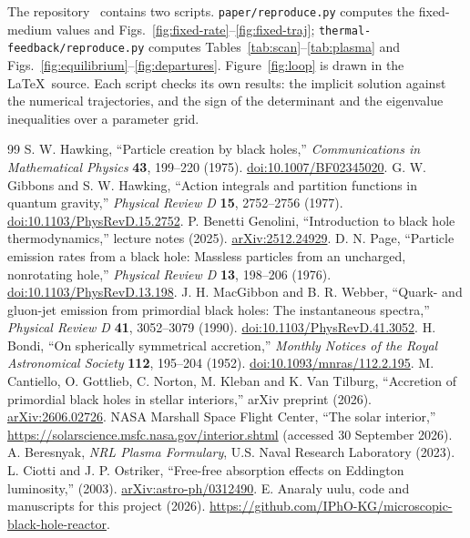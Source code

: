 \documentclass[11pt,a4paper]{article}
\begin{document}
The repository~\cite{repo} contains two scripts. \texttt{paper/reproduce.py} computes the fixed-medium values and Figs.~\ref{fig:fixed-rate}--\ref{fig:fixed-traj}; \texttt{thermal-feedback/reproduce.py} computes Tables~\ref{tab:scan}--\ref{tab:plasma} and Figs.~\ref{fig:equilibrium}--\ref{fig:departures}. Figure~\ref{fig:loop} is drawn in the \LaTeX\ source. Each script checks its own results: the implicit solution against the numerical trajectories, and the sign of the determinant and the eigenvalue inequalities over a parameter grid.

{\raggedright
\begin{thebibliography}{99}
 S. W. Hawking, ``Particle creation by black holes,'' \emph{Communications in Mathematical Physics} \textbf{43}, 199--220 (1975). \href{https://doi.org/10.1007/BF02345020}{doi:10.1007/BF02345020}.
 G. W. Gibbons and S. W. Hawking, ``Action integrals and partition functions in quantum gravity,'' \emph{Physical Review D} \textbf{15}, 2752--2756 (1977). \href{https://doi.org/10.1103/PhysRevD.15.2752}{doi:10.1103/PhysRevD.15.2752}.
 P. Benetti Genolini, ``Introduction to black hole thermodynamics,'' lecture notes (2025). \href{https://arxiv.org/abs/2512.24929}{arXiv:2512.24929}.
 D. N. Page, ``Particle emission rates from a black hole: Massless particles from an uncharged, nonrotating hole,'' \emph{Physical Review D} \textbf{13}, 198--206 (1976). \href{https://doi.org/10.1103/PhysRevD.13.198}{doi:10.1103/PhysRevD.13.198}.
 J. H. MacGibbon and B. R. Webber, ``Quark- and gluon-jet emission from primordial black holes: The instantaneous spectra,'' \emph{Physical Review D} \textbf{41}, 3052--3079 (1990). \href{https://doi.org/10.1103/PhysRevD.41.3052}{doi:10.1103/PhysRevD.41.3052}.
 H. Bondi, ``On spherically symmetrical accretion,'' \emph{Monthly Notices of the Royal Astronomical Society} \textbf{112}, 195--204 (1952). \href{https://doi.org/10.1093/mnras/112.2.195}{doi:10.1093/mnras/112.2.195}.
 M. Cantiello, O. Gottlieb, C. Norton, M. Kleban and K. Van Tilburg, ``Accretion of primordial black holes in stellar interiors,'' arXiv preprint (2026). \href{https://arxiv.org/abs/2606.02726}{arXiv:2606.02726}.
 NASA Marshall Space Flight Center, ``The solar interior,'' \url{https://solarscience.msfc.nasa.gov/interior.shtml} (accessed 30 September 2026).
 A. Beresnyak, \emph{NRL Plasma Formulary}, U.S. Naval Research Laboratory (2023).
 L. Ciotti and J. P. Ostriker, ``Free-free absorption effects on Eddington luminosity,'' (2003). \href{https://arxiv.org/abs/astro-ph/0312490}{arXiv:astro-ph/0312490}.
 E. Anaraly uulu, code and manuscripts for this project (2026). \url{https://github.com/IPhO-KG/microscopic-black-hole-reactor}.
\end{thebibliography}
}
\end{document}
